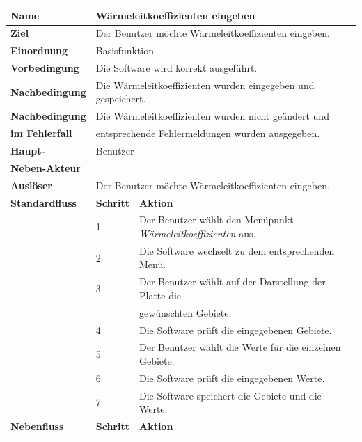 \begin{table} [H]
	\centering
	\begin{tabular}{|l|l|l|}
		\hline
		\textbf{Name} 			& \multicolumn{2}{|l|}{Wärmeleitkoeffizienten eingeben}  \\
		\hline
		\textbf{Ziel} 			& \multicolumn{2}{|l|}{Der Benutzer möchte Wärmeleitkoeffizienten eingeben. }\\ 
		\hline
		\textbf{Einordnung}		& \multicolumn{2}{|l|}{Basisfunktion}\\
		\hline
		\textbf{Vorbedingung}	& \multicolumn{2}{|l|}{Die Software wird korrekt ausgeführt.} \\
		\hline
		\textbf{Nachbedingung}	& \multicolumn{2}{|l|}{Die Wärmeleitkoeffizienten wurden eingegeben und gespeichert.}\\
		\hline
		\textbf{Nachbedingung} 	& \multicolumn{2}{|l|}{Die Wärmeleitkoeffizienten wurden nicht geändert und}\\
		\textbf{im Fehlerfall}	& \multicolumn{2}{|l|}{entsprechende Fehlermeldungen wurden ausgegeben.}\\
		\hline
		\textbf{Haupt-} 			& \multicolumn{2}{|l|}{Benutzer}\\
		\textbf{Neben-Akteur}	& \multicolumn{2}{|l|}{	}			\\
		\hline
		\textbf{Auslöser} 		& \multicolumn{2}{|l|}{Der Benutzer möchte Wärmeleitkoeffizienten eingeben.} \\
		\hline 
		\textbf{Standardfluss} & \textbf{Schritt} & \textbf{Aktion} \\
		\hline
		&	1	& Der Benutzer wählt den Menüpunkt \emph{Wärmeleitkoeffizienten} aus. \\
		\cline{2-3}
		&	2	& Die Software wechselt zu dem entsprechenden Menü.\\
		\cline{2-3}
		&	3	& Der Benutzer wählt auf der Darstellung der Platte die \\
		&       & gewünschten Gebiete.\\
		\cline{2-3}
		&	4	& Die Software prüft die eingegebenen Gebiete.\\
		\cline{2-3}
		&	5	& Der Benutzer wählt die Werte für die einzelnen Gebiete.\\
		\cline{2-3}
		&	6	& Die Software prüft die eingegebenen Werte.\\
		\cline{2-3}
		&	7	& Die Software speichert die Gebiete und die Werte.\\
		\hline
		\textbf{Nebenfluss} & \textbf{Schritt} & \textbf{Aktion}\\

\end{tabular}
\end{table}

